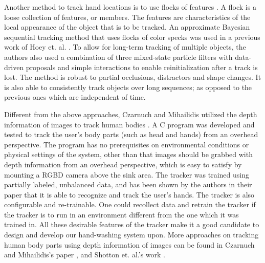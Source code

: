Another method to track hand locations is to use flocks of features \cite{hoey2006tracking}. A flock is a loose collection of features, or members. The features are characteristics of the local appearance of the object that is to be tracked. An approximate Bayesian sequential tracking method that uses flocks of color specks was used in a previous work of Hoey et. al. \cite{hoey2006tracking}. To allow for long-term tracking of multiple objects, the authors also used a combination of three mixed-state particle filters \cite{isard1998mixed} with data-driven proposals \cite{okuma2004boosted} and simple interactions to enable reinitialization after a track is lost. The method is robust to partial occlusions, distractors and shape changes. It is also able to consistently track objects over long sequences; as opposed to the previous ones which are independent of time.

Different from the above approaches, Czarnuch and Mihailidis utilized the depth information of images to track human bodies \cite{czarnuch2014}. A C program was developed and tested to track the user's body parts (such as head and hands) from an overhead perspective. The program has no prerequisites on environmental conditions or physical settings of the system, other than that images should be grabbed with depth information from an overhead perspective, which is easy to satisfy by mounting a RGBD camera above the sink area. The tracker was trained using partially labeled, unbalanced data, and has been shown by the authors in their paper that it is able to recognize and track the user's hands. The tracker is also configurable and re-trainable. One could recollect data and retrain the tracker if the tracker is to run in an environment different from the one which it was trained in. All these desirable features of the tracker make it a good candidate to design and develop our hand-washing system upon. More approaches on tracking human body parts using depth information of images can be found in Czarnuch and Mihailidis's paper \cite{czarnuch2014}, and Shotton et. al.'s work \cite{shotton2013real}.
